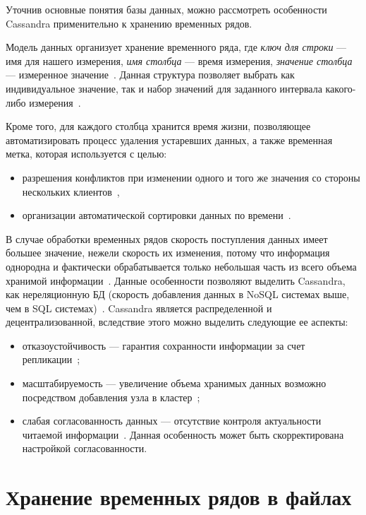 Уточнив основные понятия базы данных, можно рассмотреть особенности Cassandra применительно к хранению временных рядов.

Модель данных организует хранение временного ряда, где
\textit{ключ для строки} --- имя для нашего измерения,
\textit{имя столбца} --- время измерения,
\textit{значение столбца} --- измеренное значение~\cite{myref5}.
Данная структура позволяет выбрать как индивидуальное значение, так и набор значений для заданного интервала какого-либо измерения~\cite{myref5}.

Кроме того, для каждого столбца хранится время жизни, позволяющее автоматизировать процесс удаления устаревших данных, а также временная метка, которая используется с целью:

\begin{itemize}
\item разрешения конфликтов при изменении одного и того же значения со стороны нескольких клиентов~\cite{myref3},
\item организации автоматической сортировки данных по времени~\cite{myref5}. 
\end{itemize}

В случае обработки временных рядов скорость поступления данных имеет большее значение, нежели скорость их изменения,
потому что информация однородна и фактически обрабатывается только небольшая часть из всего объема хранимой информации~\cite{myref5}.
Данные особенности позволяют выделить Cassandra, как нереляционную БД (скорость добавления данных в NoSQL системах выше, чем в SQL системах)~\cite{myref5}.
Cassandra является распределенной и децентрализованной, вследствие этого можно выделить следующие ее аспекты:
\begin{itemize}
\item отказоустойчивость --- гарантия сохранности информации за счет репликации~\cite{myref6};
\item масштабируемость --- увеличение объема хранимых данных возможно посредством добавления узла в кластер~\cite{myref6};
\item слабая согласованность данных --- отсутствие контроля актуальности читаемой информации~\cite{myref3}.
Данная особенность может быть скорректирована настройкой согласованности. 
\end{itemize}

\section{Хранение временных рядов в  файлах}

